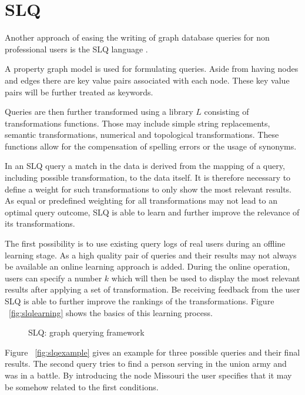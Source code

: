 \documentclass{sig-alternate}
\begin{document}
\section{SLQ}
Another approach of easing the writing of graph database queries for non
professional users is the SLQ language \cite{yang2014schemaless} \cite{yang2014slq}. 

A property graph model is used for formulating queries. Aside
from having nodes and edges there are key value pairs associated with
each node. These key value pairs will be further treated as keywords.

Queries are then further transformed using a library $L$ consisting of transformations
functions. Those may include simple string replacements, semantic transformations,
numerical and topological transformations.
These functions allow for the compensation of spelling errors or the
usage of synonyms.

In an SLQ query a match in the data is derived from the mapping
of a query, including possible transformation, to the data itself. It is therefore necessary 
to define a weight for such transformations to only show the most relevant results.
As equal or predefined weighting for all transformations may not lead to an optimal 
query outcome, SLQ is able to learn and further improve the relevance of its transformations.

The first possibility is to use existing query logs of real users during an offline learning stage.
As a high quality pair of queries and their results may not always be available an online learning approach
is added. During the online operation, users can specify a number $k$ which will then be used
to display the most relevant results after applying a set of transformation. Be receiving 
feedback from the user SLQ is able to further improve the rankings of the transformations.
Figure ~\ref{fig:slqlearning} shows the basics of this learning process.

\begin{figure}[H]
\centering
{}
\caption{SLQ: graph querying framework \cite{yang2014schemaless}}
\label{fig:slqlearning }
\end{figure}

Figure ~\ref{fig:slqexample} gives an example for three possible queries and their final results.
The second query tries to find a person serving in the union army and was in a battle. By introducing 
the node Missouri the user specifies that it may be somehow related to the first conditions.
\end{document}
